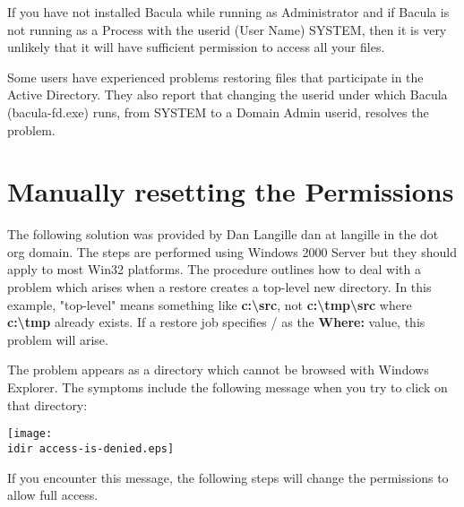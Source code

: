 If you have not installed Bacula while running as Administrator
and if Bacula is not running as a Process with the userid (User Name) SYSTEM, 
then it is very unlikely that it will have sufficient permission to
access all your files. 

Some users have experienced problems restoring files that participate in
the Active Directory. They also report that changing the userid under which
Bacula (bacula-fd.exe) runs, from SYSTEM to a Domain Admin userid, resolves
the problem.


\section{Manually resetting the Permissions}

The following solution was provided by Dan Langille \lt{}dan at langille in
the dot org domain\gt{}. The steps are performed using Windows 2000 Server but
they should apply to most Win32 platforms. The procedure outlines how to deal
with a problem which arises when a restore creates a top-level new directory.
In this example, "top-level" means something like {\bf
c:\textbackslash{}src}, not {\bf c:\textbackslash{}tmp\textbackslash{}src}
where {\bf c:\textbackslash{}tmp} already exists. If a restore job specifies /
as the {\bf Where:} value, this problem will arise. 

The problem appears as a directory which cannot be browsed with Windows
Explorer. The symptoms include the following message when you try to click on
that directory: 

\texttt{[image: \\idir access-is-denied.eps]} 

If you encounter this message, the following steps will change the permissions
to allow full access. 

